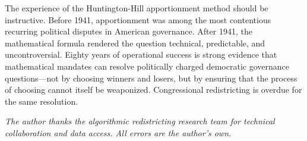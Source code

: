 The experience of the Huntington-Hill apportionment method should be instructive. Before 1941, apportionment was among the most contentious recurring political disputes in American governance. After 1941, the mathematical formula rendered the question technical, predictable, and uncontroversial. Eighty years of operational success is strong evidence that mathematical mandates can resolve politically charged democratic governance questions---not by choosing winners and losers, but by ensuring that the process of choosing cannot itself be weaponized. Congressional redistricting is overdue for the same resolution.

\bigskip

\noindent\textit{The author thanks the algorithmic redistricting research team for technical collaboration and data access. All errors are the author's own.}
